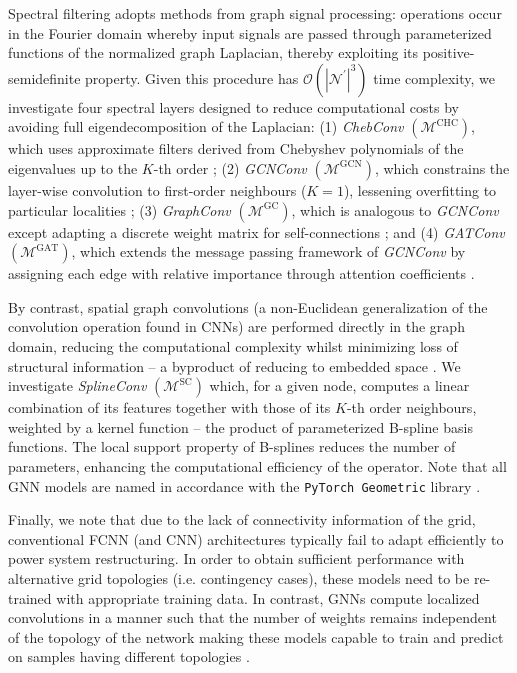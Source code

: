\documentclass[journal]{IEEEtran}
\newcommand{\Node}{\mathcal{N}}
\begin{document}
Spectral filtering adopts methods from graph signal processing: operations occur in the Fourier domain whereby input signals are passed through parameterized functions of the normalized graph Laplacian, thereby exploiting its positive-semidefinite property. Given this procedure has $\mathcal{O}(|\Node^\prime|^3)$ time complexity, we investigate four spectral layers designed to reduce computational costs by avoiding full eigendecomposition of the Laplacian: (1) \textit{ChebConv} $(\mathcal{M}^{\textrm{CHC}})$, which uses approximate filters derived from Chebyshev polynomials of the eigenvalues up to the $K$-th order \cite{Kipf2017}; (2) \textit{GCNConv} $(\mathcal{M}^{\textrm{GCN}})$, which constrains the layer-wise convolution to first-order neighbours ($K=1$), lessening overfitting to particular localities \cite{Defferrard2017}; (3) \textit{GraphConv} $(\mathcal{M}^{\textrm{GC}})$, which is analogous to \textit{GCNConv} except adapting a discrete weight matrix for self-connections \cite{Weisfeiler2020}; and (4) \textit{GATConv} $(\mathcal{M}^{\textrm{GAT}})$, which extends the message passing framework of \textit{GCNConv} by assigning each edge with relative importance through attention coefficients \cite{Velickovic2018}.

By contrast, spatial graph convolutions (a non-Euclidean generalization of the convolution operation  found in CNNs) are performed directly in the graph domain, reducing the computational complexity whilst minimizing loss of structural information -- a byproduct of reducing to embedded space \cite{Wu2020}. We investigate \textit{SplineConv} $(\mathcal{M}^{\textrm{SC}})$ \cite{Fey2018} which, for a given node, computes a linear combination of its features together with those of its $K$-th order neighbours, weighted by a kernel function -- the product of parameterized B-spline basis functions. The local support property of B-splines reduces the number of parameters, enhancing the computational efficiency of the operator. Note that all GNN models are named in accordance with the \texttt{PyTorch Geometric} library \cite{Fey2019}.

Finally, we note that due to the lack of connectivity information of the grid, conventional FCNN (and CNN) architectures typically fail to adapt efficiently to power system restructuring. In order to obtain sufficient performance with alternative grid topologies (i.e. contingency cases), these models need to be re-trained with appropriate training data. In contrast, GNNs compute localized convolutions in a manner such that the number of weights remains independent of the topology of the network making these models capable to train and predict on samples having different topologies \cite{Zonghan2021}.
\end{document}
